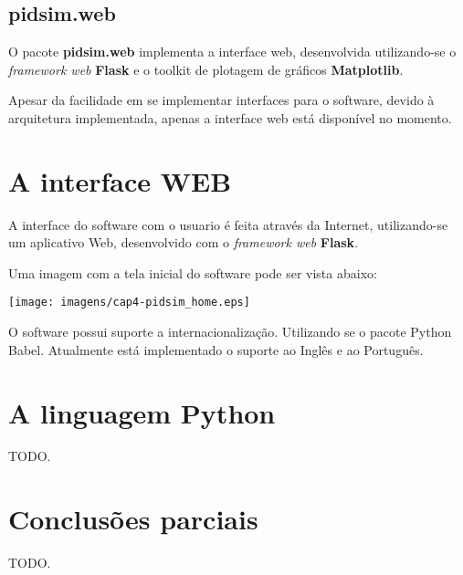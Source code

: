         \subsection{pidsim.web}
            
            O pacote \textbf{pidsim.web} implementa a interface web, desenvolvida utilizando-se
            o \textit{framework web} \textbf{Flask} e o toolkit de plotagem de gráficos \textbf{Matplotlib}.

            Apesar da facilidade em se implementar interfaces para o software, devido à arquitetura
            implementada, apenas a interface web está disponível no momento.

\section{A interface WEB}

    A interface do software com o usuario é feita através da Internet, utilizando-se um aplicativo Web,
    desenvolvido com o \textit{framework web} \textbf{Flask}.

    Uma imagem com a tela inicial do software pode ser vista abaixo:
    
    \begin{center}
        \texttt{[image: imagens/cap4-pidsim\_home.eps]}
    \end{center}

    O software possui suporte a internacionalização. Utilizando se o pacote Python Babel. Atualmente está
    implementado o suporte ao Inglês e ao Português.

\section{A linguagem Python}

    TODO.

\section{Conclusões parciais}

    TODO.
